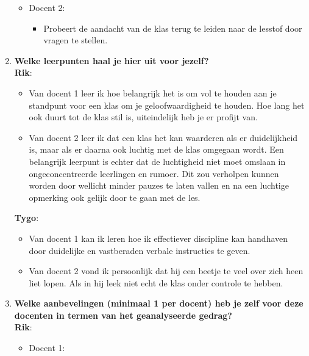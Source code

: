 \documentclass{article}
\begin{document}
\begin{enumerate}[label=(\alph*)]
\begin{itemize}
\begin{itemize}
                        \end{itemize}
                    \item Docent 2:
                        \begin{itemize}
                            \item Probeert de aandacht van de klas terug te leiden naar de lesstof door vragen te stellen.
                        \end{itemize}
                \end{itemize}
            \item \textbf{Welke leerpunten haal je hier uit voor jezelf?} \\
            \textbf {Rik}: 
                \begin{itemize}
                    \item Van docent 1 leer ik hoe belangrijk het is om vol te houden aan je standpunt voor een klas om je geloofwaardigheid te houden. Hoe lang het ook duurt tot de klas stil is, uiteindelijk heb je er profijt van.
                    \item Van docent 2 leer ik dat een klas het kan waarderen als er duidelijkheid is, maar als er daarna ook luchtig met de klas omgegaan wordt. Een belangrijk leerpunt is echter dat de luchtigheid niet moet omslaan in ongeconcentreerde leerlingen en rumoer. Dit zou verholpen kunnen worden door wellicht minder pauzes te laten vallen en na een luchtige opmerking ook gelijk door te gaan met de les.
                \end{itemize}
            \textbf{Tygo}: 
                \begin{itemize}
                    \item Van docent 1 kan ik leren hoe ik effectiever discipline kan handhaven door duidelijke en vastberaden verbale instructies te geven.
                    \item Van docent 2 vond ik persoonlijk dat hij een beetje te veel over zich heen liet lopen. Als in hij leek niet echt de klas onder controle te hebben.
                \end{itemize}
            \item \textbf{Welke aanbevelingen (minimaal 1 per docent) heb je zelf voor deze docenten in termen van het geanalyseerde gedrag?} \\
            \textbf {Rik}: 
            \begin{itemize}
                    \item Docent 1:
                        \begin{itemize}

\end{itemize}
\end{itemize}
\end{enumerate}
\end{document}
